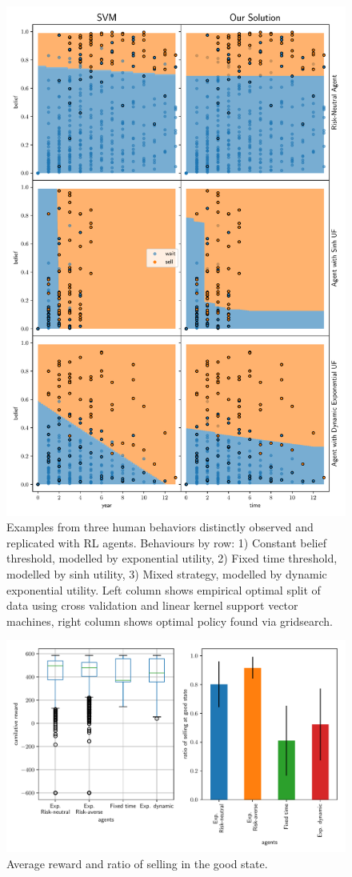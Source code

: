 
\begin{figure}
    \includegraphics[width=0.8\linewidth]{img/fit}
    \caption{Examples from three human behaviors distinctly observed and replicated with RL agents. Behaviours by row: 1) Constant belief threshold, modelled by exponential utility, 2) Fixed time threshold, modelled by sinh utility, 3) Mixed strategy, modelled by dynamic exponential utility. Left column shows empirical optimal split of data using cross validation and linear kernel support vector machines, right column shows optimal policy found via gridsearch.}
    \label{fig:svm_vs_value}
\end{figure}


\begin{figure}
\includegraphics[width=0.8\linewidth]{img/performance.pdf}
\caption{Average reward and ratio of selling in the good state.}
\end{figure}
